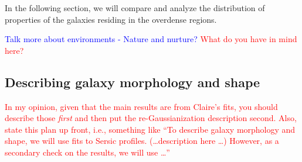 \documentclass[twocolumn,useAMS,usenatbib]{mn2e}
\newcommand{\rachel}[1]{{\textcolor{red}{#1}}}
\newcommand{\arun}[1]{{\textcolor{blue}{#1}}}
\begin{document}
In the following section, we will compare and analyze the distribution of properties of the galaxies residing in the overdense regions.

\arun{Talk more about environments - Nature and nurture?}
\rachel{What do you have in mind here?}

\subsection{Describing galaxy morphology and shape}
\label{sub:axisratio}

% 

\rachel{In my opinion, given that the main results are from Claire's
  fits, you should describe those {\em first} and then put the
  re-Gaussianization description second.  Also, state this plan up
  front, i.e., something like ``To describe galaxy morphology and
  shape, we will use fits to Sersic profiles. (\dots description here
  \dots)  However, as a secondary check on the results, we will use \dots''}
\end{document}
